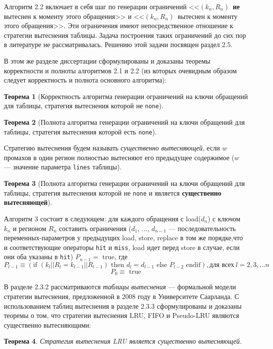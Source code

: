 \documentclass[14pt,autoref,href
,facsimile
]{disser}
\newtheorem{theorem}{Теорема}
\begin{document}
Алгоритм 2.2 включает в себя шаг по генерации ограничений <<$(k_n, R_n)$~\textbf{не} вытеснен к моменту этого обращения>> и <<$(k_n, R_n)$~вытеснен к моменту этого обращения>>. Эти ограничения имеют непосредственное отношение к стратегии вытеснения таблицы. Задача построения таких ограничений до сих пор в литературе не рассматривалась. Решению этой задачи посвящен раздел 2.5.

В этом же разделе диссертации сформулированы и доказаны теоремы корректности и полноты алгоритмов 2.1 и 2.2 (из которых очевидным образом следует корректность и полнота основного алгоритма):

\begin{theorem}[Корректность алгоритма генерации ограничений на ключи обращений для таблицы, стратегия вытеснения которой не \texttt{none}]\label{mirror_correctness}
\CorrectnessMirror
\end{theorem}

\begin{theorem}[Полнота алгоритма генерации ограничений на ключи обращений для таблицы, стратегия вытеснения которой есть \texttt{none}]\label{mirror_fullness_none}
\FullnessMirrorNone
\end{theorem}

Стратегию вытеснения будем называть \emph{существенно вытесняющей}, если $w$ промахов в один регион полностью вытесняют его предыдущее содержимое ($w$ --- значение параметра \texttt{lines} таблицы).

\begin{theorem}[Полнота алгоритма генерации ограничений на ключи обращений для таблицы, стратегия вытеснения которой не \texttt{none} и является \textbf{существенно вытесняющей}]\label{mirror_fullness}
\FullnessMirror
\end{theorem}

Алгоритм 3 состоит в следующем: для каждого обращения с load($d_n$) с ключом $k_n$ и регионом $R_n$ составить ограничения ($d_1$, ..., $d_{n-1}$ --- последовательность переменных-параметров у предыдущих load, store, replace в том же порядке,что и соответствующие операторы \texttt{hit} и \texttt{miss}, load идет перед store в случае, если они оба указаны в \texttt{hit}) $P_{n-1} = \mbox{~true}$, где
$$P_{l-1} \equiv (\mbox{if~} (k_l||R_l = k_{l-1}||R_{l-1}) \mbox{~then~} d_l =
d_{l-1} \mbox{~else~} P_{l-2} \mbox{~endif}), \mbox{для всех}~l = 2, 3, ... n$$
$$P_0 \equiv \mbox{~true}$$

В разделе 2.3.2 рассматриваются \emph{таблицы вытеснения} --- формальной модели стратегии вытеснения, предложенной в 2008 году в Университете Саарланда. С использованием таблиц вытеснения в разделе 2.3.3 сформулированы и доказаны теоремы о том, что стратегии вытеснения LRU, FIFO и Pseudo-LRU являются существенно вытесняющими:
\begin{theorem}\label{thm:LRU_essential}
Стратегия вытеснения LRU является существенно вытесняющей.
\end{theorem}
\end{document}
